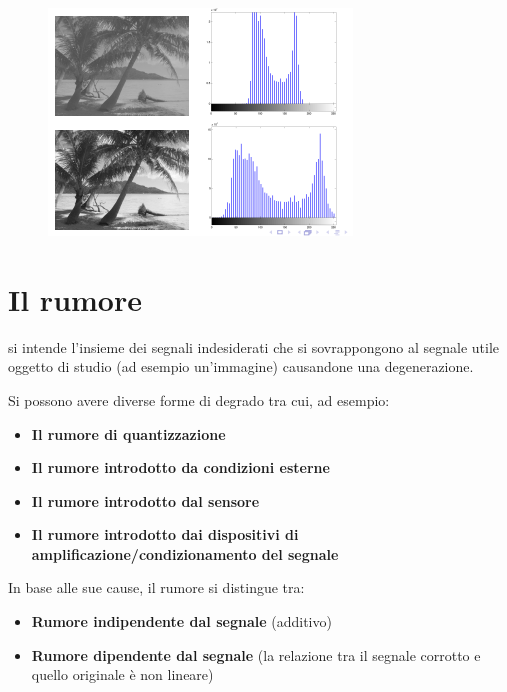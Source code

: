 \begin{figure}[H]
    \centering
    \includegraphics[width=\linewidth, keepaspectratio]{capitoli/immagini/imgs/stretch-isto.png}
\end{figure}

\section{Il rumore}

\begin{definition}
    si intende l'insieme dei segnali indesiderati che si sovrappongono al segnale utile oggetto di studio (ad esempio un'immagine) causandone una degenerazione.
\end{definition}
Si possono avere diverse forme di degrado tra cui, ad esempio:
\begin{itemize}
    \item \textbf{Il rumore di quantizzazione}
    \item \textbf{Il rumore introdotto da condizioni esterne}
    \item \textbf{Il rumore introdotto dal sensore}
    \item \textbf{Il rumore introdotto dai dispositivi di amplificazione/condizionamento del segnale}
\end{itemize}

In base alle sue cause, il rumore si distingue tra:
\begin{itemize}
    \item \textbf{Rumore indipendente dal segnale} (additivo)
    \item \textbf{Rumore dipendente dal segnale} (la relazione tra il segnale corrotto e quello originale è non lineare)
\end{itemize}

